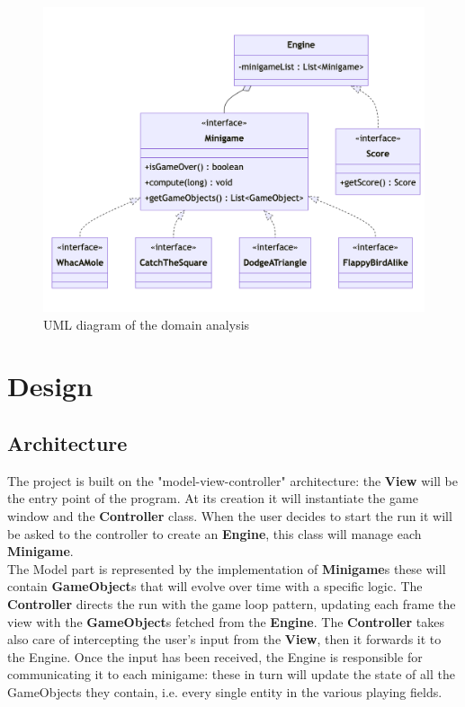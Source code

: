 \documentclass[a4paper,12pt]{report}
\begin{document}
\begin{figure}[ht]
	\centering{}
	\includegraphics[width=\textwidth]{domain.png}
	\caption{UML diagram of the domain analysis}
\end{figure}

\chapter{Design}

\section{Architecture}
The project is built on the "model-view-controller" architecture: the \textbf{View} will be the entry point of the program.
At its creation it will instantiate the game window and the \textbf{Controller} class.
When the user decides to start the run it will be asked to the controller to create an \textbf{Engine}, this class will manage each \textbf{Minigame}.\\
The Model part is represented by the implementation of \textbf{Minigame}s these will contain \textbf{GameObject}s that will evolve over time with a specific logic.
The \textbf{Controller} directs the run with the game loop pattern, updating each frame the view with the \textbf{GameObject}s fetched from the \textbf{Engine}.
The \textbf{Controller} takes also care of intercepting the user's input from the \textbf{View}, then it forwards it to the Engine.
Once the input has been received, the Engine is responsible for communicating it to each minigame: these in turn will update the state of all the GameObjects they contain, i.e. every single entity in the various playing fields.
\end{document}
